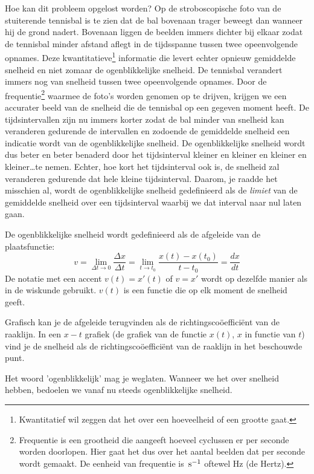 \documentclass{ximera}
\begin{document}
Hoe kan dit probleem opgelost worden? Op de stroboscopische foto van de stuiterende tennisbal is te zien dat de bal bovenaan trager beweegt dan wanneer hij de grond nadert. Bovenaan liggen de beelden immers dichter bij elkaar zodat de tennisbal minder afstand aflegt in de tijdsspanne tussen twee opeenvolgende opnames. 
Deze kwantitatieve\footnote{Kwantitatief wil zeggen dat het over een hoeveelheid of een grootte gaat.} informatie die levert echter opnieuw gemiddelde snelheid en niet zomaar de ogenblikkelijke snelheid. De tennisbal verandert immers nog van snelheid tussen twee opeenvolgende opnames. Door de frequentie\footnote{Frequentie is een grootheid die aangeeft hoeveel cyclussen er per seconde worden doorlopen. Hier gaat het dus over het aantal beelden dat per seconde wordt gemaakt. De eenheid van frequentie is $\rm\,s^{-1}$ oftewel Hz (de Hertz).} waarmee de foto's worden genomen op te drijven, krijgen we een accurater beeld van de snelheid die de tennisbal op een gegeven moment heeft. De tijdsintervallen zijn nu immers korter zodat de bal minder van snelheid kan veranderen gedurende de intervallen en zodoende de gemiddelde snelheid een indicatie wordt van de ogenblikkelijke snelheid. De ogenblikkelijke snelheid wordt dus beter en beter benaderd door het tijdsinterval kleiner en kleiner en kleiner en kleiner\ldots te nemen. Echter, hoe kort het tijdsinterval ook is, de snelheid zal veranderen gedurende dat hele kleine tijdsinterval. Daarom, je raadde het misschien al, wordt de ogenblikkelijke snelheid gedefinieerd als de \emph{limiet} van de gemiddelde snelheid over een tijdsinterval waarbij we dat interval naar nul laten gaan. 

\begin{definition}
	
De ogenblikkelijke snelheid wordt gedefinieerd als de afgeleide van de plaatsfunctie:
\[
v=\lim_{\Delta t\to 0}\frac{\Delta x}{\Delta t}=\lim_{t\to t_0}\frac{x(t)-x(t_0)}{t-t_0}=\frac{dx}{dt}
\]
De notatie met een accent $v(t)=x'(t)$ of $v=x'$ wordt op dezelfde manier als in de wiskunde gebruikt. $v(t)$ is een functie die op elk moment de snelheid geeft. 
\end{definition}


Grafisch kan je de afgeleide terugvinden als de richtingscoöefficiënt van de raaklijn. In een $x-t$ grafiek (de grafiek van de functie $x(t)$, $x$ in functie van $t$) vind je  de snelheid als de richtingscoöefficiënt van de raaklijn in het beschouwde punt. 

\begin{remark}
	Het woord 'ogenblikkelijk' mag je weglaten. Wanneer we het over snelheid hebben, bedoelen we vanaf nu steeds ogenblikkelijke snelheid.
\end{remark}
\end{document}
